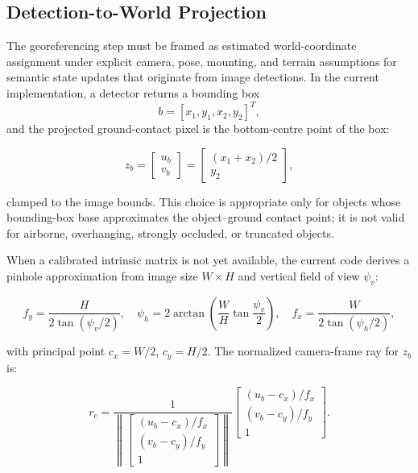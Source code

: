 \documentclass[fleqn]{VRIH2025}
\begin{document}
\subsection{Detection-to-World Projection}

The georeferencing step must be framed as estimated world-coordinate assignment under explicit camera, pose, mounting, and terrain assumptions for semantic state updates that originate from image detections. In the current implementation, a detector returns a bounding box
\[
b=[x_1,y_1,x_2,y_2]^T,
\]
and the projected ground-contact pixel is the bottom-centre point of the box:

\begin{equation}
z_b =
\begin{bmatrix}
u_b\\
v_b
\end{bmatrix}
=
\begin{bmatrix}
(x_1+x_2)/2\\
y_2
\end{bmatrix},
\label{eq:bbox-base-pixel}
\end{equation}

clamped to the image bounds. This choice is appropriate only for objects whose bounding-box base approximates the object--ground contact point; it is not valid for airborne, overhanging, strongly occluded, or truncated objects.

When a calibrated intrinsic matrix is not yet available, the current code derives a pinhole approximation from image size \(W\times H\) and vertical field of view \(\psi_v\):

\begin{equation}
f_y=\frac{H}{2\tan(\psi_v/2)},\quad
\psi_h=2\arctan\!\left(\frac{W}{H}\tan\frac{\psi_v}{2}\right),\quad
f_x=\frac{W}{2\tan(\psi_h/2)},
\label{eq:fov-intrinsics}
\end{equation}

with principal point \(c_x=W/2\), \(c_y=H/2\). The normalized camera-frame ray for \(z_b\) is:

\begin{equation}
r_c =
\frac{1}{\left\|
\begin{bmatrix}
 (u_b-c_x)/f_x\\
 (v_b-c_y)/f_y\\
1
\end{bmatrix}
\right\|}
\begin{bmatrix}
 (u_b-c_x)/f_x\\
 (v_b-c_y)/f_y\\
1
\end{bmatrix}.
\label{eq:camera-ray}
\end{equation}
\end{document}
